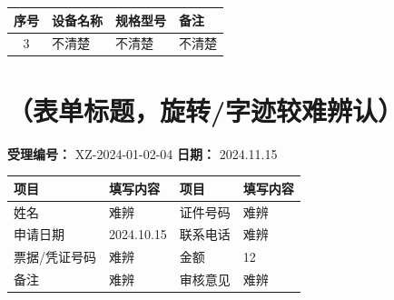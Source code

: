 \documentclass[UTF8,10pt,a4paper,fontset=fandol]{ctexart}
\newcommand{\fieldvalue}[1]{#1}
\newcommand{\handwritten}[1]{#1}
\begin{document}
\begin{tabularx}{\textwidth}{|c|X|X|X|}
\hline
序号 & 设备名称 & 规格型号 & 备注 \\
\hline
3 &
\fieldvalue{\handwritten{不清楚}} &
\fieldvalue{\handwritten{不清楚}} &
\fieldvalue{\handwritten{不清楚}} \\
\hline
\end{tabularx}


\newpage

\section*{（表单标题，旋转/字迹较难辨认）}

\noindent
\textbf{受理编号：}%
\fieldvalue{XZ-2024-01-02-04}
\hfill
\textbf{日期：}%
\fieldvalue{\handwritten{2024.11.15}}

\begin{tabularx}{\textwidth}{|p{2.3cm}|X|p{2.3cm}|X|}
\hline
项目 &
填写内容 &
项目 &
填写内容 \\
\hline
姓名 &
\fieldvalue{\handwritten{难辨}} &
证件号码 &
\fieldvalue{\handwritten{难辨}} \\
\hline
申请日期 &
\fieldvalue{\handwritten{2024.10.15}} &
联系电话 &
\fieldvalue{\handwritten{难辨}} \\
\hline
票据/凭证号码 &
\fieldvalue{\handwritten{难辨}} &
金额 &
\fieldvalue{\handwritten{12}} \\
\hline
备注 &
\fieldvalue{\handwritten{难辨}} &
审核意见 &
\fieldvalue{\handwritten{难辨}} \\
\hline
\end{tabularx}
\end{document}

